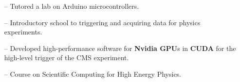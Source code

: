 \documentclass[10pt,a4paper]{altacv}
\begin{document}
\begin{itemize}
    \setlength{\itemindent}{0.5em}
    \item[--]   \small{Tutored a lab on Arduino microcontrollers.}
\end{itemize}

\medskip


\begin{itemize}
    \setlength{\itemindent}{0.5em}
    \item[--]   \small{Introductory school to triggering and acquiring data for physics experiments.}
\end{itemize}

\medskip


\begin{itemize}
    \setlength{\itemindent}{0.5em}
    \item[--]   \small{Developed high-performance software for \textbf{Nvidia GPU}s in \textbf{CUDA} for the high-level trigger of the CMS experiment.}
\end{itemize}

\medskip


\begin{itemize}
    \setlength{\itemindent}{0.5em}
    \item[--]   \small{Course on Scientific Computing for High Energy Physics.}
\end{itemize}

\medskip



\end{document}
